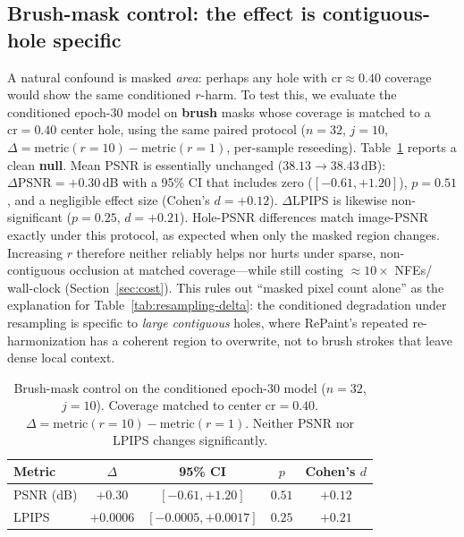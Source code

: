 \subsection{Brush-mask control: the effect is contiguous-hole specific}
\label{sec:brush-null}
A natural confound is masked \emph{area}: perhaps any hole with $\mathrm{cr}{\approx}0.40$ coverage would show the same conditioned $r$-harm.
To test this, we evaluate the conditioned epoch-$30$ model on \textbf{brush} masks whose coverage is matched to a $\mathrm{cr}{=}0.40$ center hole, using the same paired protocol ($n{=}32$, $j{=}10$, $\Delta{=}\mathrm{metric}(r{=}10)-\mathrm{metric}(r{=}1)$, per-sample reseeding).
Table~\ref{tab:brush-null} reports a clean \textbf{null}.
Mean PSNR is essentially unchanged ($38.13\to38.43$\,dB):
$\Delta\mathrm{PSNR}{=}{+}0.30$\,dB with a 95\% CI that includes zero ($[{-}0.61,{+}1.20]$), $p{=}0.51$, and a negligible effect size (Cohen's $d{=}{+}0.12$).
$\Delta$LPIPS is likewise non-significant ($p{=}0.25$, $d{=}{+}0.21$).
Hole-PSNR differences match image-PSNR exactly under this protocol, as expected when only the masked region changes.
Increasing $r$ therefore neither reliably helps nor hurts under sparse, non-contiguous occlusion at matched coverage---while still costing ${\approx}10{\times}$ NFEs/$\,$wall-clock (Section~\ref{sec:cost}).
This rules out ``masked pixel count alone'' as the explanation for Table~\ref{tab:resampling-delta}:
the conditioned degradation under resampling is specific to \emph{large contiguous} holes, where RePaint's repeated re-harmonization has a coherent region to overwrite, not to brush strokes that leave dense local context.

\begin{table}[H]
  \centering
  \caption{Brush-mask control on the conditioned epoch-$30$ model ($n{=}32$, $j{=}10$).
  Coverage matched to center $\mathrm{cr}{=}0.40$.
  $\Delta{=}\mathrm{metric}(r{=}10)-\mathrm{metric}(r{=}1)$.
  Neither PSNR nor LPIPS changes significantly.}
  \label{tab:brush-null}
  \begin{tabular}{lcccc}
    \toprule
    Metric & $\Delta$ & 95\% CI & $p$ & Cohen's $d$ \\
    \midrule
    PSNR (dB) & $+0.30$ & $[-0.61,+1.20]$ & $0.51$ & $+0.12$ \\
    LPIPS & $+0.0006$ & $[-0.0005,+0.0017]$ & $0.25$ & $+0.21$ \\
    \bottomrule
  \end{tabular}
\end{table}

